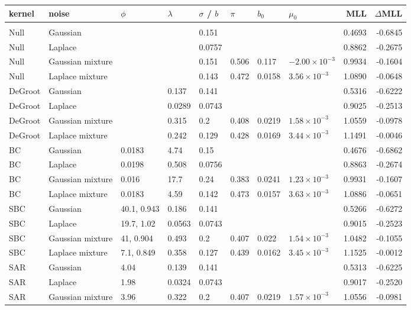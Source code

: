 \begin{longtable}{llllllllrr}
\toprule
kernel & noise & $\phi$ & $\lambda$ & $\sigma$ / $b$ & $\pi$ & $b_0$ & $\mu_0$ & MLL & $\Delta$MLL \\
\midrule
\endhead
\multicolumn{10}{l}{\adamsLo{}} \\
Null & Gaussian &  &  & 0.151 &  &  &  & 0.4693 & -0.6845 \\
Null & Laplace &  &  & 0.0757 &  &  &  & 0.8862 & -0.2675 \\
Null & Gaussian mixture &  &  & 0.151 & 0.506 & 0.117 & $-2.00\times10^{-3}$ & 0.9934 & -0.1604 \\
Null & Laplace mixture &  &  & 0.143 & 0.472 & 0.0158 & $3.56\times10^{-3}$ & 1.0890 & -0.0648 \\
DeGroot & Gaussian &  & 0.137 & 0.141 &  &  &  & 0.5316 & -0.6222 \\
DeGroot & Laplace &  & 0.0289 & 0.0743 &  &  &  & 0.9025 & -0.2513 \\
DeGroot & Gaussian mixture &  & 0.315 & 0.2 & 0.408 & 0.0219 & $1.58\times10^{-3}$ & 1.0559 & -0.0978 \\
DeGroot & Laplace mixture &  & 0.242 & 0.129 & 0.428 & 0.0169 & $3.44\times10^{-3}$ & 1.1491 & -0.0046 \\
BC & Gaussian & 0.0183 & 4.74 & 0.15 &  &  &  & 0.4676 & -0.6862 \\
BC & Laplace & 0.0198 & 0.508 & 0.0756 &  &  &  & 0.8863 & -0.2674 \\
BC & Gaussian mixture & 0.016 & 17.7 & 0.24 & 0.383 & 0.0241 & $1.23\times10^{-3}$ & 0.9931 & -0.1607 \\
BC & Laplace mixture & 0.0183 & 4.59 & 0.142 & 0.473 & 0.0157 & $3.63\times10^{-3}$ & 1.0886 & -0.0651 \\
SBC & Gaussian & 40.1, 0.943 & 0.186 & 0.141 &  &  &  & 0.5266 & -0.6272 \\
SBC & Laplace & 19.7, 1.02 & 0.0563 & 0.0743 &  &  &  & 0.9015 & -0.2523 \\
SBC & Gaussian mixture & 41, 0.904 & 0.493 & 0.2 & 0.407 & 0.022 & $1.54\times10^{-3}$ & 1.0482 & -0.1055 \\
SBC & Laplace mixture & 7.1, 0.849 & 0.358 & 0.127 & 0.439 & 0.0162 & $3.45\times10^{-3}$ & 1.1525 & -0.0012 \\
SAR & Gaussian & 4.04 & 0.139 & 0.141 &  &  &  & 0.5313 & -0.6225 \\
SAR & Laplace & 1.98 & 0.0324 & 0.0743 &  &  &  & 0.9017 & -0.2520 \\
SAR & Gaussian mixture & 3.96 & 0.322 & 0.2 & 0.407 & 0.0219 & $1.57\times10^{-3}$ & 1.0556 & -0.0981 \\

\end{longtable}
